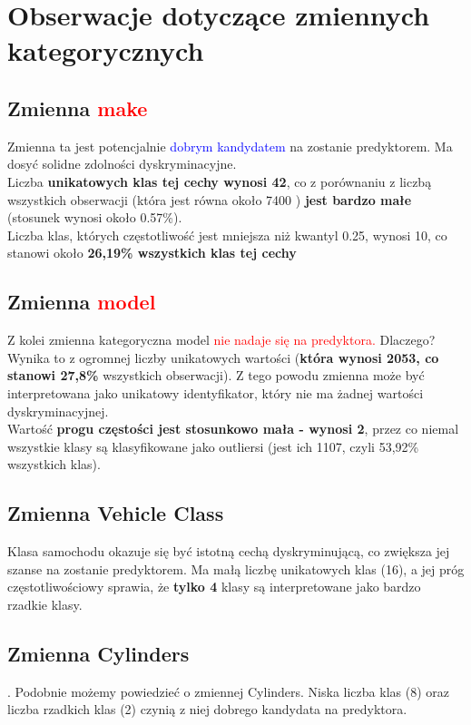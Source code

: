 \documentclass{article}
\begin{document}
\section{Obserwacje dotyczące zmiennych kategorycznych}
\subsection{Zmienna \textbf{\textcolor{red}{make}}}
Zmienna ta jest potencjalnie \textcolor{blue}{dobrym kandydatem} na zostanie predyktorem. Ma dosyć solidne zdolności dyskryminacyjne. \\
Liczba \textbf{unikatowych klas tej cechy wynosi 42}, co z porównaniu z liczbą wszystkich obserwacji (która jest równa około 7400 ) \textbf{jest bardzo małe} (stosunek wynosi około 0.57\%).\\
Liczba klas, których częstotliwość jest mniejsza niż kwantyl 0.25, wynosi 10, co stanowi około \textbf{26,19\% wszystkich klas tej cechy}


\subsection{Zmienna \textbf{\textcolor{red}{model}}}
Z kolei zmienna kategoryczna model \textcolor{red}{nie nadaje się na predyktora.} Dlaczego?
Wynika to z ogromnej liczby unikatowych wartości (\textbf{która wynosi 2053, co stanowi 27,8\%} wszystkich obserwacji). Z tego powodu zmienna może być interpretowana jako unikatowy identyfikator, który nie ma żadnej wartości dyskryminacyjnej. \\
Wartość \textbf{progu częstości jest stosunkowo mała - wynosi 2}, przez co niemal wszystkie klasy są klasyfikowane jako outliersi (jest ich 1107, czyli 53,92\% wszystkich klas).


\subsection{Zmienna Vehicle Class}
Klasa samochodu okazuje się być istotną cechą dyskryminującą, co zwiększa jej szanse na zostanie predyktorem. Ma małą liczbę unikatowych klas (16), a jej próg częstotliwościowy sprawia, że \textbf{tylko 4} klasy są interpretowane jako bardzo rzadkie klasy.

\subsection{Zmienna Cylinders}.
Podobnie możemy powiedzieć o zmiennej Cylinders. Niska liczba klas (8) oraz liczba rzadkich klas (2) czynią z niej dobrego kandydata na predyktora.
\end{document}
